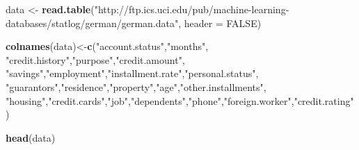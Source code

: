 \documentclass[]{article}
\newenvironment{Shaded}{\begin{snugshade}}{\end{snugshade}}
\newcommand{\KeywordTok}[1]{\textcolor[rgb]{0.13,0.29,0.53}{\textbf{{#1}}}}
\newcommand{\DataTypeTok}[1]{\textcolor[rgb]{0.13,0.29,0.53}{{#1}}}
\newcommand{\StringTok}[1]{\textcolor[rgb]{0.31,0.60,0.02}{{#1}}}
\newcommand{\OtherTok}[1]{\textcolor[rgb]{0.56,0.35,0.01}{{#1}}}
\newcommand{\NormalTok}[1]{{#1}}
\numberwithin{equation}{section}
\begin{document}
\begin{Shaded}
\begin{Highlighting}[]
\NormalTok{data <-}\StringTok{ }\KeywordTok{read.table}\NormalTok{(}\StringTok{"http://ftp.ics.uci.edu/pub/machine-learning-databases/statlog/german/german.data"}\NormalTok{, }\DataTypeTok{header =} \OtherTok{FALSE}\NormalTok{)}

\KeywordTok{colnames}\NormalTok{(data)<-}\KeywordTok{c}\NormalTok{(}\StringTok{"account.status"}\NormalTok{,}\StringTok{"months"}\NormalTok{,}
                \StringTok{"credit.history"}\NormalTok{,}\StringTok{"purpose"}\NormalTok{,}\StringTok{"credit.amount"}\NormalTok{,}
                \StringTok{"savings"}\NormalTok{,}\StringTok{"employment"}\NormalTok{,}\StringTok{"installment.rate"}\NormalTok{,}\StringTok{"personal.status"}\NormalTok{,}
                \StringTok{"guarantors"}\NormalTok{,}\StringTok{"residence"}\NormalTok{,}\StringTok{"property"}\NormalTok{,}\StringTok{"age"}\NormalTok{,}\StringTok{"other.installments"}\NormalTok{,}
                \StringTok{"housing"}\NormalTok{,}\StringTok{"credit.cards"}\NormalTok{,}\StringTok{"job"}\NormalTok{,}\StringTok{"dependents"}\NormalTok{,}\StringTok{"phone"}\NormalTok{,}\StringTok{"foreign.worker"}\NormalTok{,}\StringTok{"credit.rating"}\NormalTok{)}

\KeywordTok{head}\NormalTok{(data)}
\end{Highlighting}
\end{Shaded}
\end{document}
